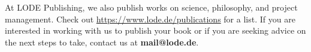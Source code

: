 At LODE Publishing, we also publish works on science, philosophy, and project management. Check out \url{https://www.lode.de/publications} for a list. If you are interested in working with us to publish your book or if you are seeking advice on the next steps to take, contact us at \textbf{mail@lode.de}.
